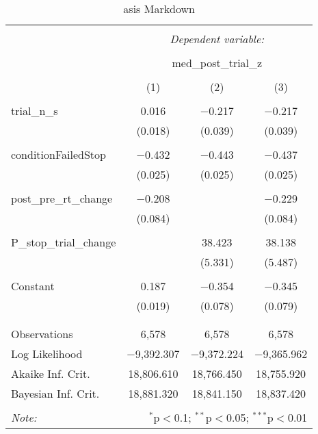 \documentclass[
]{article}
\begin{document}
\begin{table}[!htbp] \centering 
  \caption{asis Markdown} 
  \label{} 
\begin{tabular}{@{\extracolsep{5pt}}lccc} 
\\[-1.8ex]\hline 
\hline \\[-1.8ex] 
 & \multicolumn{3}{c}{\textit{Dependent variable:}} \\ 
\cline{2-4} 
\\[-1.8ex] & \multicolumn{3}{c}{med\_post\_trial\_z} \\ 
\\[-1.8ex] & (1) & (2) & (3)\\ 
\hline \\[-1.8ex] 
 trial\_n\_s & 0.016 & $-$0.217 & $-$0.217 \\ 
  & (0.018) & (0.039) & (0.039) \\ 
  & & & \\ 
 conditionFailedStop & $-$0.432 & $-$0.443 & $-$0.437 \\ 
  & (0.025) & (0.025) & (0.025) \\ 
  & & & \\ 
 post\_pre\_rt\_change & $-$0.208 &  & $-$0.229 \\ 
  & (0.084) &  & (0.084) \\ 
  & & & \\ 
 P\_stop\_trial\_change &  & 38.423 & 38.138 \\ 
  &  & (5.331) & (5.487) \\ 
  & & & \\ 
 Constant & 0.187 & $-$0.354 & $-$0.345 \\ 
  & (0.019) & (0.078) & (0.079) \\ 
  & & & \\ 
\hline \\[-1.8ex] 
Observations & 6,578 & 6,578 & 6,578 \\ 
Log Likelihood & $-$9,392.307 & $-$9,372.224 & $-$9,365.962 \\ 
Akaike Inf. Crit. & 18,806.610 & 18,766.450 & 18,755.920 \\ 
Bayesian Inf. Crit. & 18,881.320 & 18,841.150 & 18,837.420 \\ 
\hline 
\hline \\[-1.8ex] 
\textit{Note:}  & \multicolumn{3}{r}{$^{*}$p$<$0.1; $^{**}$p$<$0.05; $^{***}$p$<$0.01} \\ 
\end{tabular} 
\end{table}
\end{document}
